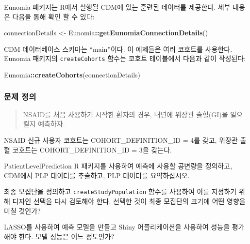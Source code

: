 \documentclass[11pt]{book}
\newenvironment{Shaded}{\begin{snugshade}}{\end{snugshade}}
\newcommand{\KeywordTok}[1]{\textcolor[rgb]{0.13,0.29,0.53}{\textbf{#1}}}
\newcommand{\StringTok}[1]{\textcolor[rgb]{0.31,0.60,0.02}{#1}}
\newcommand{\OperatorTok}[1]{\textcolor[rgb]{0.81,0.36,0.00}{\textbf{#1}}}
\newcommand{\NormalTok}[1]{#1}
\theoremstyle{definition}
\theoremstyle{definition}
\theoremstyle{definition}
\theoremstyle{remark}
\let\BeginKnitrBlock\begin \let\EndKnitrBlock\end
\begin{document}
Eunomia 패키지는 R에서 실행될 CDM에 있는 훈련된 데이터를 제공한다. 세부
내용은 다음을 통해 확인 할 수 있다:

\begin{Shaded}
\begin{Highlighting}[]
\NormalTok{connectionDetails <-}\StringTok{ }\NormalTok{Eunomia}\OperatorTok{::}\KeywordTok{getEunomiaConnectionDetails}\NormalTok{()}
\end{Highlighting}
\end{Shaded}

CDM 데이터베이스 스키마는 ``main''이다. 이 예제들은 여러 코호트를
사용한다. Eunomia 패키지의 \texttt{createCohorts} 함수는 코호트
테이블에서 다음과 같이 작성된다:

\begin{Shaded}
\begin{Highlighting}[]
\NormalTok{Eunomia}\OperatorTok{::}\KeywordTok{createCohorts}\NormalTok{(connectionDetails)}
\end{Highlighting}
\end{Shaded}

\subsubsection*{문제 정의}\label{--4}

\begin{quote}
NSAID를 처음 사용하기 시작한 환자의 경우, 내년에 위장관 출혈(GI)을
일으킬지 예측하자.
\end{quote}

NSAID 신규 사용자 코호트는 COHORT\_DEFINITION\_ID = 4를 갖고, 위장관
출혈 코호트는 COHORT\_DEFINITION\_ID = 3을 갖는다.

\BeginKnitrBlock{exercise}
\protect\hypertarget{exr:exercisePlp1}{}{\label{exr:exercisePlp1}
}PatientLevelPrediction R 패키지를 사용하여 예측에 사용할 공변량을
정의하고, CDM에서 PLP 데이터를 추출하고, PLP 데이터를 요약하십시오.
\EndKnitrBlock{exercise}

\BeginKnitrBlock{exercise}
\protect\hypertarget{exr:exercisePlp2}{}{\label{exr:exercisePlp2} }최종
모집단을 정의하고 \texttt{createStudyPopulation} 함수를 사용하여 이를
지정하기 위해 디자인 선택을 다시 검토해야 한다. 선택한 것이 최종
모집단의 크기에 어떤 영향을 미칠 것인가?
\EndKnitrBlock{exercise}

\BeginKnitrBlock{exercise}
\protect\hypertarget{exr:exercisePlp3}{}{\label{exr:exercisePlp3} }LASSO를
사용하여 예측 모델을 만들고 Shiny 어플리케이션을 사용하여 성능을
평가해야 한다. 모델 성능은 어느 정도인가?
\EndKnitrBlock{exercise}
\end{document}
